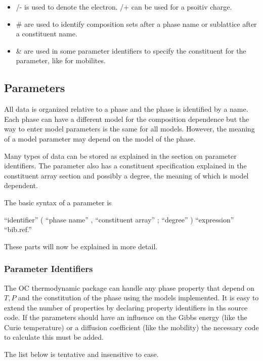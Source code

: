 \documentclass[12pt]{article}
\begin{document}
\begin{itemize}
\item /- is used to denote the electron. /+ can be used for a psoitiv charge.
\item \# are used to identify composition sets after a phase name or
sublattice after a constituent name.
\item \& are used in some parameter identifiers to specify the
  constituent for the parameter, like for mobilites.
\end{itemize}

\subsection{Parameters}

All data is organized relative to a phase and the phase is identified
by a name.  Each phase can have a different model for the composition
dependence but the way to enter model parameters is the same for all
models.  However, the meaning of a model parameter may depend on the
model of the phase.

Many types of data can be stored as explained in the section on
parameter identifiers.  The parameter also has a constituent
specification explained in the constituent array section and possibly
a degree, the meaning of which is model dependent.

The basic syntax of a parameter is

``identifier'' ( ``phase name'' , ``constituent array'' ; ``degree'' ) ``expression'' ``bib.ref.''

These parts will now be explained in more detail.

\subsubsection{Parameter Identifiers}\label{sc:paramid}

The OC thermodynamic package can handle any phase property that depend
on $T, P$ and the constitution of the phase using the models
implemented.  It is easy to extend the number of properties by
declaring property identifiers in ths source code.  If the parameters
should have an influence on the Gibbs energy (like the Curie
temperature) or a diffusion coefficient (like the mobility) the
necessary code to calculate this must be added.

The list below is tentative and insensitive to case.
\end{document}
